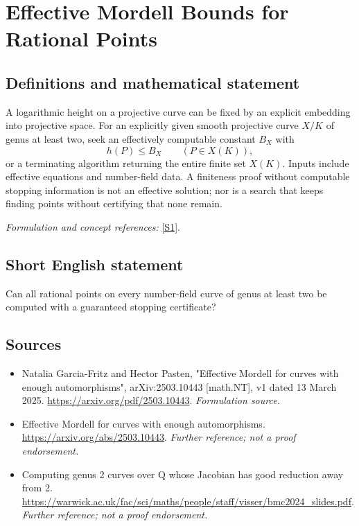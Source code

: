 \documentclass[11pt]{article}
\begin{document}
\section*{\texorpdfstring{Effective Mordell Bounds for Rational Points}{Effective Mordell Bounds for Rational Points}}\label{30006474}
\subsection{Definitions and mathematical statement}
A logarithmic height on a projective curve can be fixed by an explicit embedding into projective space. For an explicitly given smooth projective curve $X/K$ of genus at least two, seek an effectively computable constant $B_X$ with
\[
 h(P)\le B_X\qquad(P\in X(K)),
\]
or a terminating algorithm returning the entire finite set $X(K)$. Inputs include effective equations and number-field data. A finiteness proof without computable stopping information is not an effective solution; nor is a search that keeps finding points without certifying that none remain.
\par\smallskip\textit{Formulation and concept references:} \href{https://arxiv.org/pdf/2503.10443}{[S1]}.

\subsection{Short English statement}
Can all rational points on every number-field curve of genus at least two be computed with a guaranteed stopping certificate?
\subsection{Sources}
\begin{itemize}
\item[S1]Natalia Garcia-Fritz and Hector Pasten, "Effective Mordell for curves with enough automorphisms", arXiv:2503.10443 [math.NT], v1 dated 13 March 2025.
\url{https://arxiv.org/pdf/2503.10443}.
\textit{Formulation source.}
\item[S2]Effective Mordell for curves with enough automorphisms.
\url{https://arxiv.org/abs/2503.10443}.
\textit{Further reference; not a proof endorsement.}
\item[S3]Computing genus 2 curves over Q whose Jacobian has good reduction away from 2.
\url{https://warwick.ac.uk/fac/sci/maths/people/staff/visser/bmc2024_slides.pdf}.
\textit{Further reference; not a proof endorsement.}
\end{itemize}
\end{document}
